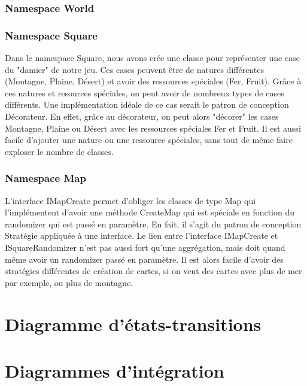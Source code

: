 		\subsubsection{Namespace World}
			\subsubsection{Namespace Square}
				Dans le namespace Square, nous avons crée une classe pour représenter une case du "damier" de notre jeu.
			Ces cases peuvent être de natures différentes (Montagne, Plaine, Désert) et avoir des ressources spéciales (Fer, Fruit).
			Grâce à ces natures et resources spéciales, on peut avoir de nombreux types de cases différents.
			Une implémentation idéale de ce cas serait le patron de conception Décorateur.
			En effet, grâce au décorateur, on peut alors "décorer" les cases Montagne, Plaine ou Désert avec les ressources spéciales Fer et Fruit.
			Il est aussi facile d'ajouter une nature ou une ressource spéciales, sans tout de même faire exploser le nombre de classes.
			
			\subsubsection{Namespace Map}
				L'interface IMapCreate permet d'obliger les classes de type Map qui l'implémentent d'avoir une méthode CreateMap qui est spéciale en fonction du randomizer qui est passé en paramètre.
			En fait, il s'agit du patron de conception Stratégie appliquée à une interface.
			Le lien entre l'interface IMapCreate et ISquareRandomizer n'est pas aussi fort qu'une aggrégation, mais doit quand même avoir un randomizer passé en paramètre.
			Il est alors facile d'avoir des stratégies différentes de création de cartes, si on veut des cartes avec plus de mer par exemple, ou plus de montagne.
			
	
\section{Diagramme d'états-transitions}

\section{Diagrammes d'intégration}








































